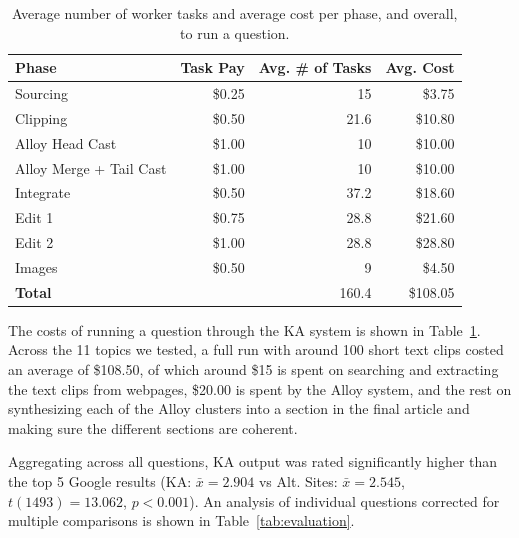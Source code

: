\begin{table}
  \centering
  \small
  \begin{tabular}{lrrr}
    \hline
    \textbf{Phase} & \textbf{Task Pay} & \textbf{Avg. \# of Tasks} & \textbf{Avg. Cost} \\
    \hline
	Sourcing & \$0.25 & 15 & \$3.75 \\

    Clipping & \$0.50 & 21.6 & \$10.80 \\

    Alloy Head Cast & \$1.00 & 10 & \$10.00 \\

    Alloy Merge + Tail Cast & \$1.00 & 10 & \$10.00 \\

    Integrate & \$0.50 & 37.2 & \$18.60 \\

    Edit 1 & \$0.75 & 28.8 & \$21.60 \\

    Edit 2 & \$1.00 & 28.8 & \$28.80 \\

    Images & \$0.50 & 9 & \$4.50 \\
    \hline    
    \textbf{Total} & & 160.4 & \$108.05 \\
    \hline
  \end{tabular}
  \caption[Average number of worker tasks and cost of running KA.]{Average number of worker tasks and average cost per phase, and overall, to run a question.}
  \label{tab:cost}
\end{table}

The costs of running a question through the KA system is shown in Table~\ref{tab:cost}. Across the 11 topics we tested, a full run with around 100 short text clips costed an average of \$108.50, of which around \$15 is spent on searching and extracting the text clips from webpages, \$20.00 is spent by the Alloy system, and the rest on synthesizing each of the Alloy clusters into a section in the final article and making sure the different sections are coherent.

Aggregating across all questions, KA output was rated significantly higher than the top 5 Google results (KA: $\bar{x} = 2.904$ vs Alt. Sites: $\bar{x} = 2.545$, $t(1493) = 13.062$, $p < 0.001$). An analysis of individual questions corrected for multiple comparisons is shown in Table~\ref{tab:evaluation}. 

